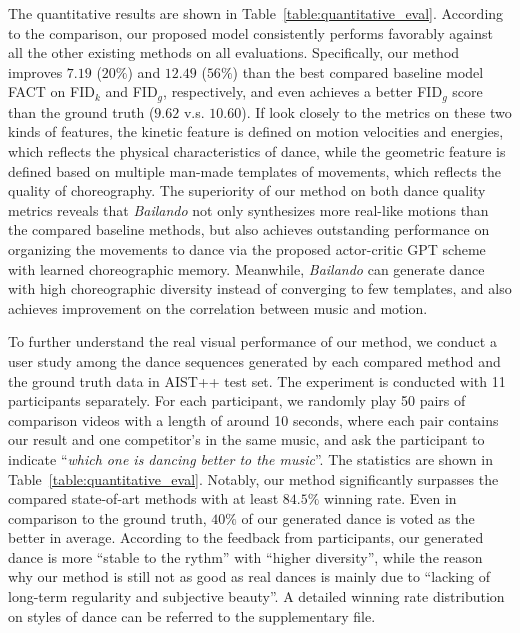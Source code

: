 The quantitative results are shown in Table~\ref{table:quantitative_eval}.
According to the comparison, our proposed model consistently performs favorably against all the other existing methods on all evaluations.
Specifically, our method improves $7.19$ ($20\%$) and $12.49$ ($56\%$) than the best compared baseline model FACT on FID$_k$ and FID$_g$, respectively, and even achieves a better FID$_g$ score than the ground truth ($9.62$ v.s. $10.60$).
If look closely to the metrics on these two kinds of features, the kinetic feature is defined on motion velocities and energies, which reflects the physical characteristics of dance, while the geometric feature is defined based on multiple man-made templates of movements, which reflects the quality of choreography.
The superiority of our method on both dance quality metrics reveals that {{\textit{Bailando}}} not only synthesizes more real-like motions than the compared baseline methods, but also achieves outstanding performance on organizing the movements to dance via the proposed  actor-critic GPT  scheme with learned choreographic memory.
Meanwhile, {{\textit{Bailando}}} can generate dance with high choreographic diversity instead of converging to few templates, and also achieves improvement on the correlation between music and motion.



To further understand the real visual performance of our method, we conduct a user study among the dance sequences generated by each compared method and the ground truth data in AIST++ test set.
The experiment is conducted with 11 participants separately.
For each participant, we randomly play 50 pairs of  comparison videos with a length of around 10 seconds, where each pair contains our result and one competitor's in the same music, and ask the participant to indicate ``\textit{which one is dancing better to the music}''.
The statistics are shown in Table~\ref{table:quantitative_eval}.
Notably, our method significantly surpasses the compared state-of-art methods with at least $84.5\%$ winning rate.
Even in comparison to the ground truth, $40\%$ of our generated dance is voted as the better in average.
According to the feedback from participants, our generated dance is more ``stable to the rythm'' with ``higher diversity'', while the reason why our method is still not as good as real dances is mainly due to ``lacking of long-term regularity  and subjective beauty''.
A detailed winning rate distribution on styles of dance can be referred to the supplementary file.








